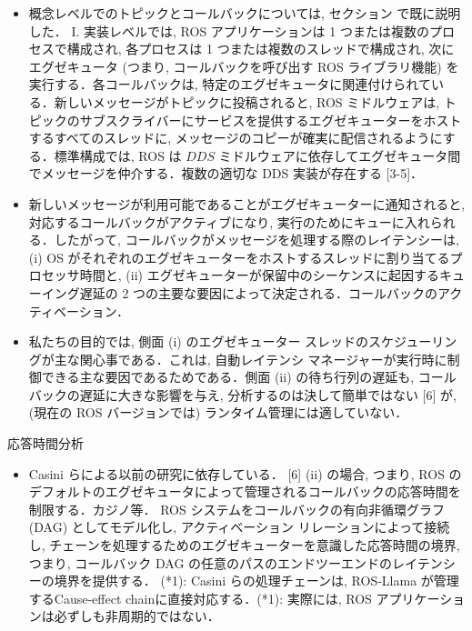 \begin{frame}{}
    \begin{itemize}
        \item 概念レベルでのトピックとコールバックについては, セクション で既に説明した． I. 実装レベルでは, ROS アプリケーションは 1 つまたは複数のプロセスで構成され, 各プロセスは 1 つまたは複数のスレッドで構成され, 次にエグゼキュータ (つまり, コールバックを呼び出す ROS ライブラリ機能) を実行する．各コールバックは, 特定のエグゼキュータに関連付けられている．新しいメッセージがトピックに投稿されると, ROS ミドルウェアは, トピックのサブスクライバーにサービスを提供するエグゼキューターをホストするすべてのスレッドに, メッセージのコピーが確実に配信されるようにする．標準構成では, ROS は $D D S$ ミドルウェアに依存してエグゼキュータ間でメッセージを仲介する．複数の適切な DDS 実装が存在する [3-5]．
    \end{itemize}
\end{frame}

\begin{frame}{}
    \begin{itemize}
        \item 新しいメッセージが利用可能であることがエグゼキューターに通知されると, 対応するコールバックがアクティブになり, 実行のためにキューに入れられる．したがって, コールバックがメッセージを処理する際のレイテンシーは, (i) OS がそれぞれのエグゼキューターをホストするスレッドに割り当てるプロセッサ時間と, (ii) エグゼキューターが保留中のシーケンスに起因するキューイング遅延の 2 つの主要な要因によって決定される．コールバックのアクティベーション．
    \end{itemize}
\end{frame}

\begin{frame}{}
    \begin{itemize}
        \item 私たちの目的では, 側面 (i) のエグゼキューター スレッドのスケジューリングが主な関心事である．これは, 自動レイテンシ マネージャーが実行時に制御できる主な要因であるためである．側面 (ii) の待ち行列の遅延も, コールバックの遅延に大きな影響を与え, 分析するのは決して簡単ではない [6] が, (現在の ROS バージョンでは) ランタイム管理には適していない．
    \end{itemize}
\end{frame}

\begin{frame}{応答時間分析}
    \begin{itemize}
        \item Casini らによる以前の研究に依存している． [6] (ii) の場合, つまり, ROS のデフォルトのエグゼキュータによって管理されるコールバックの応答時間を制限する．カジノ等． ROS システムをコールバックの有向非循環グラフ (DAG) としてモデル化し, アクティベーション リレーションによって接続し, チェーンを処理するためのエグゼキューターを意識した応答時間の境界, つまり, コールバック DAG の任意のパスのエンドツーエンドのレイテンシーの境界を提供する． (*1): Casini らの処理チェーンは, ROS-Llama が管理するCause-effect chainに直接対応する．(*1): 実際には, ROS アプリケーションは必ずしも非周期的ではない．
    \end{itemize}
\end{frame}

